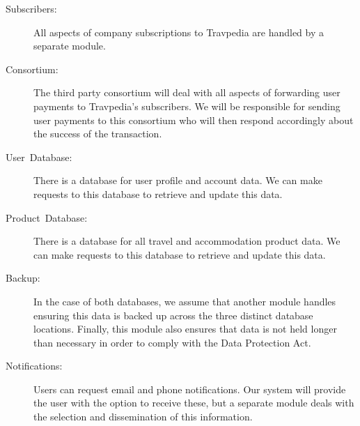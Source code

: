 \begin{description}
	\item [{Subscribers:}] All aspects of company subscriptions to Travpedia
		are handled by a separate module.
	\item [{Consortium:}] The third party consortium will deal with all aspects
		of forwarding user payments to Travpedia's subscribers. We will be
		responsible for sending user payments to this consortium who will then
		respond accordingly about the success of the transaction.
	\item [{User~Database:}] There is a database for user profile and account
		data.  We can make requests to this database to retrieve and update
		this data.
	\item [{Product~Database:}] There is a database for all travel and
		accommodation product data. We can make requests to this database to
		retrieve and update this data.
	\item [{Backup:}] In the case of both databases, we assume that another
		module handles ensuring this data is backed up across the three
		distinct database locations. Finally, this module also ensures that
		data is not held longer than necessary in order to comply with the Data
		Protection Act.
	\item [{Notifications:}] Users can request email and phone notifications.
		Our system will provide the user with the option to receive these, but
		a separate module deals with the selection and dissemination of this
		information.
\end{description}
